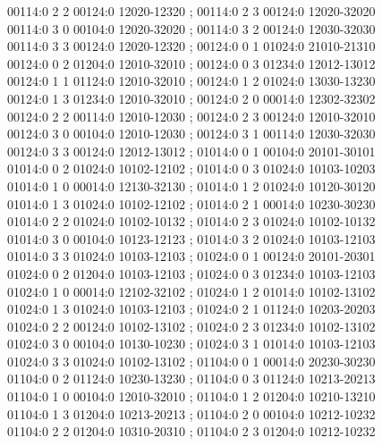 \documentclass[11pt]{article}
\theoremstyle{remark}
\numberwithin{equation}{section}
\numberwithin{table}{section}
\begin{document}
\begin{flushleft}
00114:0 2 2 00124:0 12020-12320 ; 00114:0 2 3 00124:0 12020-32020\\
00114:0 3 0 00104:0 12020-32020 ; 00114:0 3 2 00124:0 12030-32030\\
00114:0 3 3 00124:0 12020-12320 ; 00124:0 0 1 01024:0 21010-21310\\
00124:0 0 2 01204:0 12010-32010 ; 00124:0 0 3 01234:0 12012-13012\\
00124:0 1 1 01124:0 12010-32010 ; 00124:0 1 2 01024:0 13030-13230\\
00124:0 1 3 01234:0 12010-32010 ; 00124:0 2 0 00014:0 12302-32302\\
00124:0 2 2 00114:0 12010-12030 ; 00124:0 2 3 00124:0 12010-32010\\
00124:0 3 0 00104:0 12010-12030 ; 00124:0 3 1 00114:0 12030-32030\\
00124:0 3 3 00124:0 12012-13012 ; 01014:0 0 1 00104:0 20101-30101\\
01014:0 0 2 01024:0 10102-12102 ; 01014:0 0 3 01024:0 10103-10203\\
01014:0 1 0 00014:0 12130-32130 ; 01014:0 1 2 01024:0 10120-30120\\
01014:0 1 3 01024:0 10102-12102 ; 01014:0 2 1 00014:0 10230-30230\\
01014:0 2 2 01024:0 10102-10132 ; 01014:0 2 3 01024:0 10102-10132\\
01014:0 3 0 00104:0 10123-12123 ; 01014:0 3 2 01024:0 10103-12103\\
01014:0 3 3 01024:0 10103-12103 ; 01024:0 0 1 00124:0 20101-20301\\
01024:0 0 2 01204:0 10103-12103 ; 01024:0 0 3 01234:0 10103-12103\\
01024:0 1 0 00014:0 12102-32102 ; 01024:0 1 2 01014:0 10102-13102\\
01024:0 1 3 01024:0 10103-12103 ; 01024:0 2 1 01124:0 10203-20203\\
01024:0 2 2 00124:0 10102-13102 ; 01024:0 2 3 01234:0 10102-13102\\
01024:0 3 0 00104:0 10130-10230 ; 01024:0 3 1 01014:0 10103-12103\\
01024:0 3 3 01024:0 10102-13102 ; 01104:0 0 1 00014:0 20230-30230\\
01104:0 0 2 01124:0 10230-13230 ; 01104:0 0 3 01124:0 10213-20213\\
01104:0 1 0 00104:0 12010-32010 ; 01104:0 1 2 01204:0 10210-13210\\
01104:0 1 3 01204:0 10213-20213 ; 01104:0 2 0 00104:0 10212-10232\\
01104:0 2 2 01204:0 10310-20310 ; 01104:0 2 3 01204:0 10212-10232\\

\end{flushleft}
\end{document}
